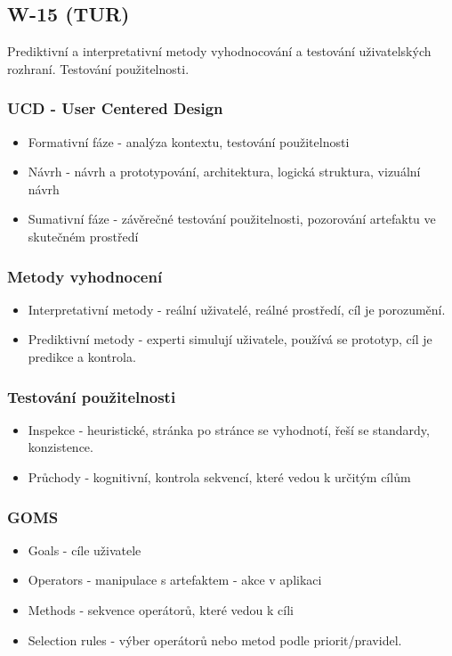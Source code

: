 \subsection{W-15 (TUR)}
Prediktivní a interpretativní metody vyhodnocování a testování uživatelských rozhraní. Testování použitelnosti.

\subsubsection*{UCD - User Centered Design}
\begin{itemize}
  \item Formativní fáze - analýza kontextu, testování použitelnosti
  \item Návrh - návrh a prototypování, architektura, logická struktura, vizuální návrh
  \item Sumativní fáze - závěrečné testování použitelnosti, pozorování artefaktu ve skutečném prostředí
\end{itemize}

\subsubsection*{Metody vyhodnocení}

\begin{itemize}
  \item Interpretativní metody - reální uživatelé, reálné prostředí, cíl je porozumění.
  \item Prediktivní metody - experti simulují uživatele, používá se prototyp, cíl je predikce a kontrola.
\end{itemize}

\subsubsection*{Testování použitelnosti}

\begin{itemize}
  \item Inspekce - heuristické, stránka po stránce se vyhodnotí, řeší se standardy, konzistence.
  \item Průchody - kognitivní, kontrola sekvencí, které vedou k určitým cílům
\end{itemize}

\subsubsection*{GOMS}
\begin{itemize}
  \item Goals - cíle uživatele
  \item Operators - manipulace s artefaktem - akce v aplikaci
  \item Methods - sekvence operátorů, které vedou k cíli
  \item Selection rules - výber operátorů nebo metod podle priorit/pravidel.
\end{itemize}
